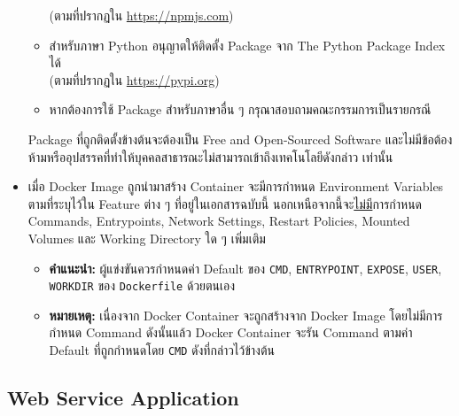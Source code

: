 \begin{itemize}
\begin{itemize}[topsep=0pc,itemsep=0pc]
                (ตามที่ปรากฏใน \url{https://npmjs.com})
            \item
                สำหรับภาษา Python อนุญาตให้ติดตั้ง Package จาก The Python Package Index ได้ \\
                (ตามที่ปรากฏใน \url{https://pypi.org})
            \item
                หากต้องการใช้ Package สำหรับภาษาอื่น ๆ กรุณาสอบถามคณะกรรมการเป็นรายกรณี
        \end{itemize}
        Package ที่ถูกติดตั้งข้างต้นจะต้องเป็น Free and Open-Sourced Software และไม่มีข้อต้องห้ามหรืออุปสรรคที่ทำให้บุคคลสาธารณะไม่สามารถเข้าถึงเทคโนโลยีดังกล่าว เท่านั้น
    \item
        เมื่อ Docker Image ถูกนำมาสร้าง Container จะมีการกำหนด Environment Variables ตามที่ระบุไว้ใน Feature ต่าง ๆ ที่อยู่ในเอกสารฉบับนี้ \;
        นอกเหนือจากนี้จะ\uline{ไม่มี}การกำหนด Commands, Entrypoints, Network Settings, Restart Policies, Mounted Volumes และ Working Directory ใด ๆ เพิ่มเติม
        \newpage
        \begin{itemize}[topsep=0pc,itemsep=0pc]
            \item
                \textbf{คำแนะนำ:} ผู้แข่งขันควรกำหนดค่า Default ของ \verb'CMD', \verb'ENTRYPOINT', \verb'EXPOSE', \verb'USER', \verb'WORKDIR' ของ \verb'Dockerfile' ด้วยตนเอง
            \item
                \textbf{หมายเหตุ:} เนื่องจาก Docker Container จะถูกสร้างจาก Docker Image โดยไม่มีการกำหนด Command ดังนั้นแล้ว Docker Container จะรัน Command ตามค่า Default ที่ถูกกำหนดโดย \verb'CMD' ดังที่กล่าวไว้ข้างต้น
        \end{itemize}
\end{itemize}

\subsection{Web Service Application}

